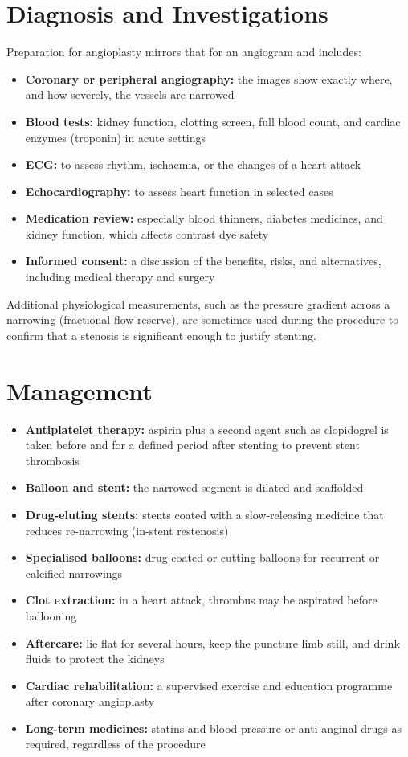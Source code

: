 \section*{Diagnosis and Investigations}
Preparation for angioplasty mirrors that for an angiogram and includes:

\begin{itemize}
    \item \textbf{Coronary or peripheral angiography:} the images show exactly where, and how severely, the vessels are narrowed
    \item \textbf{Blood tests:} kidney function, clotting screen, full blood count, and cardiac enzymes (troponin) in acute settings
    \item \textbf{ECG:} to assess rhythm, ischaemia, or the changes of a heart attack
    \item \textbf{Echocardiography:} to assess heart function in selected cases
    \item \textbf{Medication review:} especially blood thinners, diabetes medicines, and kidney function, which affects contrast dye safety
    \item \textbf{Informed consent:} a discussion of the benefits, risks, and alternatives, including medical therapy and surgery
\end{itemize}

Additional physiological measurements, such as the pressure gradient across a narrowing (fractional flow reserve), are sometimes used during the procedure to confirm that a stenosis is significant enough to justify stenting.

\section*{Management}
\begin{itemize}
    \item \textbf{Antiplatelet therapy:} aspirin plus a second agent such as clopidogrel is taken before and for a defined period after stenting to prevent stent thrombosis
    \item \textbf{Balloon and stent:} the narrowed segment is dilated and scaffolded
    \item \textbf{Drug-eluting stents:} stents coated with a slow-releasing medicine that reduces re-narrowing (in-stent restenosis)
    \item \textbf{Specialised balloons:} drug-coated or cutting balloons for recurrent or calcified narrowings
    \item \textbf{Clot extraction:} in a heart attack, thrombus may be aspirated before ballooning
    \item \textbf{Aftercare:} lie flat for several hours, keep the puncture limb still, and drink fluids to protect the kidneys
    \item \textbf{Cardiac rehabilitation:} a supervised exercise and education programme after coronary angioplasty
    \item \textbf{Long-term medicines:} statins and blood pressure or anti-anginal drugs as required, regardless of the procedure
\end{itemize}

